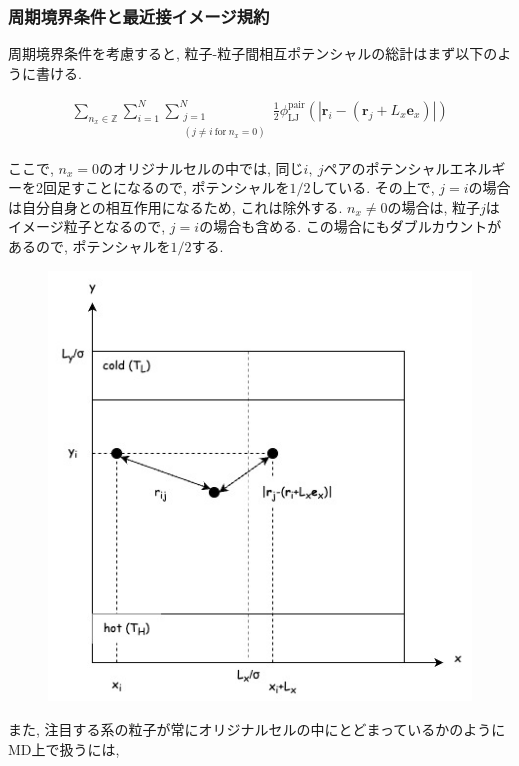 \documentclass[dvipdfmx]{jsarticle}
\numberwithin{equation}{subsection}
\begin{document}
\subsubsection{周期境界条件と最近接イメージ規約}

周期境界条件を考慮すると, 粒子-粒子間相互ポテンシャルの総計はまず以下のように書ける.

\begin{align}
  \sum_{n_x \in \mathbb{Z}} \sum_{i=1}^{N} \sum_{\substack{j=1 \\ (j \neq i \ \text{for} \ n_{x} = 0)}}^{N} \frac{1}{2} \phi_{\text{LJ}}^{\text{pair}}(|\bm{r}_i -(\bm{r}_j + L_x \bm{e}_x)|)
\end{align}

ここで, $n_x = 0$のオリジナルセルの中では, 同じ$i,\ j$ペアのポテンシャルエネルギーを2回足すことになるので, ポテンシャルを$1/2$している. その上で, $j = i$の場合は自分自身との相互作用になるため, これは除外する. $n_x \neq 0$の場合は, 粒子$j$はイメージ粒子となるので, $j=i$の場合も含める. この場合にもダブルカウントがあるので, ポテンシャルを$1/2$する.

\begin{figure}[H]
  \centering
  \caption{}
  \label{fig:system_periodic}
  \includegraphics[scale=0.7]{image/system_periodic.jpg}
\end{figure}

また, 注目する系の粒子が常にオリジナルセルの中にとどまっているかのようにMD上で扱うには,
\end{document}
